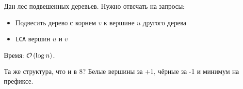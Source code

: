 \begin{task}[9]
Дан лес подвешенных деревьев. Нужно отвечать на запросы:
\begin{itemize}
	\item Подвесить дерево с корнем $v$ к вершине $u$ другого дерева
	\item \texttt{LCA} вершин $u$ и $v$
\end{itemize}
Время: $\mathcal{O}\left(\log{n}\right)$.
\end{task}
\begin{solution}
Та же структура, что и в $8$?
Белые вершины за +1, чёрные за -1 и минимум на префиксе.
\end{solution}


